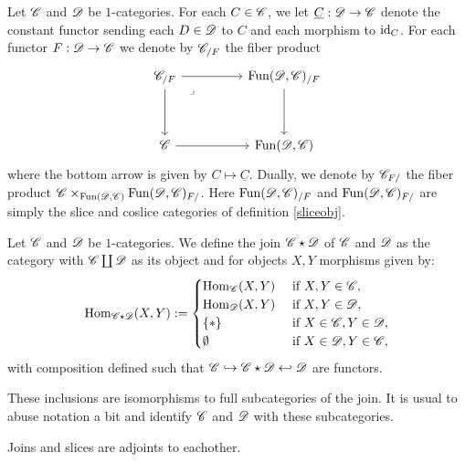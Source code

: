 \documentclass[../../thesis.tex]{subfiles}
\begin{document}
\begin{definition}\label{slicefun}
    Let $\mathscr{C}$ and $\mathscr{D}$ be $1$-categories.
    For each $C\in \mathscr{C}$, we let $\underline{C} : \mathscr{D} \to \mathscr{C}$ denote the constant functor sending each $D\in \mathscr{D}$ to $C$ and each morphism to $\operatorname{id}_C$.
    For each functor $F:\mathscr{D}\to\mathscr{C}$ we denote by $\mathscr{C}_{/F}$ the fiber product
    \[\begin{tikzcd}
            {\C_{/F}} && {\Fun(\D,\C)_{/F}} \\
            \\
            \C && {\Fun(\D,\C)}
            \arrow[from=1-1, to=1-3]
            \arrow[from=1-1, to=3-1]
            \arrow[from=3-1, to=3-3]
            \arrow[from=1-3, to=3-3]
            \arrow["\lrcorner"{anchor=center, pos=0.125}, draw=none, from=1-1, to=3-3]
        \end{tikzcd}\]
    where the bottom arrow is given by $C \mapsto \underline{C}$.
    Dually, we denote by $\mathscr{C}_{F/}$ the fiber product ${\mathscr{C} \times_{\mathrm{Fun}(\mathscr{D},\mathscr{C})}\mathrm{Fun}(\mathscr{D},\mathscr{C})_{F/}}$.
    Here $\mathrm{Fun}(\mathscr{D},\mathscr{C})_{/F}$ and $\mathrm{Fun}(\mathscr{D},\mathscr{C})_{F/}$ are simply the slice and coslice categories of definition \ref{sliceobj}.
\end{definition}
\begin{definition}
    Let $\mathscr{C}$ and $\mathscr{D}$ be $1$-categories.
    We define the join $\mathscr{C} \star \mathscr{D}$ of $\mathscr{C}$ and $\mathscr{D}$ as the category with $\mathscr{C} \coprod \mathscr{D}$ as its object and for objects $X, Y$ morphisms given by:
    \[
        \mathrm{Hom}_{\mathscr{C} \star \mathscr{D}}(X,Y) : =
        \begin{cases}
            \mathrm{Hom}_{\mathscr{C}}(X,Y) & \text{ if } X,Y \in \mathscr{C},         \\
            \mathrm{Hom}_{\mathscr{D}}(X,Y) & \text{ if } X,Y \in \mathscr{D},         \\
            \{*\}          & \text{ if } X \in \mathscr{C}, Y \in \mathscr{D}, \\
            \emptyset      & \text{ if } X \in \mathscr{D}, Y\in \mathscr{C},
        \end{cases}
    \]
    with composition defined such that $\mathscr{C} \hookrightarrow \mathscr{C} \star \mathscr{D} \hookleftarrow \mathscr{D}$ are functors.
\end{definition}
\begin{remark}
    These inclusions are isomorphisms to full subcategories of the join.
    It is usual to abuse notation a bit and identify $\mathscr{C}$ and $\mathscr{D}$ with these subcategories.
\end{remark}
\begin{remark}
    Joins and slices are adjoints to eachother.
\end{remark}
\end{document}
